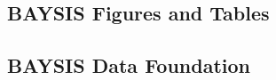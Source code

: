 \begin{appendices}

    \chapter{BAYSIS Figures and Tables}
    \label{appendix_baysis}
    
    \tocless\section{BAYSIS Data Foundation}
    \label{appendix_baysis_dataset}
    
    
    
    
    

\end{appendices}
